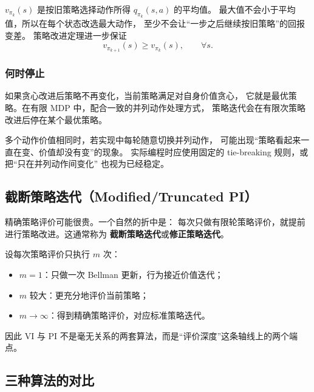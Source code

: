 \documentclass[11pt,a4paper,fontset=fandol]{ctexart}
\begin{document}
\begin{intuitionbox}[为什么改进后不会更差？]
\(v_{\pi_k}(s)\) 是按旧策略选择动作所得 \(q_{\pi_k}(s,a)\) 的平均值。
最大值不会小于平均值，所以在每个状态改选最大动作，
至少不会让“一步之后继续按旧策略”的回报变差。
策略改进定理进一步保证
\[
v_{\pi_{k+1}}(s)\geq v_{\pi_k}(s),\qquad \forall s.
\]
\end{intuitionbox}

\subsubsection{何时停止}

如果贪心改进后策略不再变化，当前策略满足对自身价值贪心，
它就是最优策略。在有限 MDP 中，配合一致的并列动作处理方式，
策略迭代会在有限次策略改进后停在某个最优策略。

\begin{warningbox}[并列动作]
多个动作价值相同时，若实现中每轮随意切换并列动作，
可能出现“策略看起来一直在变、价值却没有变”的现象。
实际编程时应使用固定的 tie-breaking 规则，或把“只在并列动作间变化”
也视为已经稳定。
\end{warningbox}

\subsection{截断策略迭代（Modified/Truncated PI）}

精确策略评价可能很贵。一个自然的折中是：
每次只做有限轮策略评价，就提前进行策略改进。这通常称为
\textbf{截断策略迭代}或\textbf{修正策略迭代}。

设每次策略评价只执行 \(m\) 次：

\begin{itemize}
  \item \(m=1\)：只做一次 Bellman 更新，行为接近价值迭代；
  \item \(m\) 较大：更充分地评价当前策略；
  \item \(m\to\infty\)：得到精确策略评价，对应标准策略迭代。
\end{itemize}

因此 VI 与 PI 不是毫无关系的两套算法，而是“评价深度”这条轴线上的两个端点。

\subsection{三种算法的对比}
\end{document}
